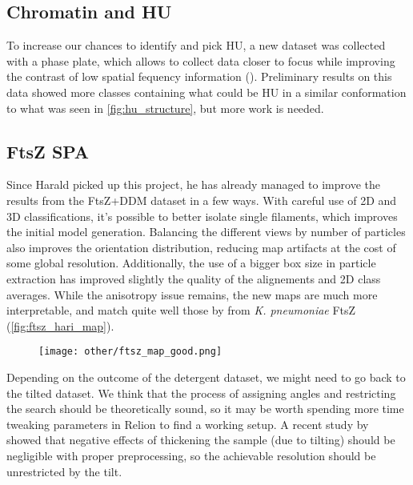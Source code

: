 \subsection{Chromatin and HU}\label{future_hu}

To increase our chances to identify and pick HU, a new dataset was collected with a phase plate, which allows to collect data closer to focus while improving the contrast of low spatial fequency information ().
Preliminary results on this data showed more classes containing what could be HU in a similar conformation to what was seen in \autoref{fig:hu_structure}, but more work is needed.


\subsection{FtsZ SPA}\label{future_ftsz_spa}

Since Harald picked up this project, he has already managed to improve the results from the FtsZ+DDM dataset in a few ways.
With careful use of 2D and 3D classifications, it's possible to better isolate single filaments, which improves the initial model generation.
Balancing the different views by number of particles also improves the orientation distribution, reducing map artifacts at the cost of some global resolution.
Additionally, the use of a bigger box size in particle extraction has improved slightly the quality of the alignements and 2D class averages.
While the anisotropy issue remains, the new maps are much more interpretable, and match quite well those by \citet{fujitaStructuresFtsZSingle2023} from \textit{K. pneumoniae} FtsZ (\autoref{fig:ftsz_hari_map}).

\begin{figure}
    \centering
    \texttt{[image: other/ftsz\_map\_good.png]}
    \label{fig:ftsz_hari_map}
\end{figure}

Depending on the outcome of the detergent dataset, we might need to go back to the tilted dataset.
We think that the process of assigning angles and restricting the search should be theoretically sound, so it may be worth spending more time tweaking parameters in Relion to find a working setup.
A recent study by ~\citet{aiyerOvercomingResolutionAttenuation2024} showed that negative effects of thickening the sample (due to tilting) should be negligible with proper preprocessing, so the achievable resolution should be unrestricted by the tilt.

